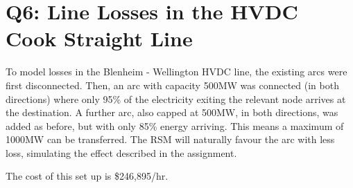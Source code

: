 \documentclass[11pt]{article}
\begin{document}
\section*{Q6: Line Losses in the HVDC Cook Straight Line}
To model losses in the Blenheim - Wellington HVDC line, the existing arcs were first disconnected. Then, an arc with capacity 500MW was connected (in both directions) where only 95\% of the electricity exiting the relevant node arrives at the destination. A further arc, also capped at 500MW, in both directions, was added as before, but with only 85\% energy arriving. This means a maximum of 1000MW can be transferred. The RSM will naturally favour the arc with less loss, simulating the effect described in the assignment. 

The cost of this set up is \$246,895/hr. 
\end{document}
